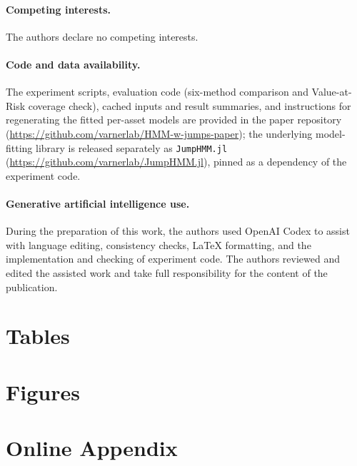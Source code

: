 \documentclass{article}
\theoremstyle{definition}
\theoremstyle{remark}
\begin{document}
\paragraph{Competing interests.}
The authors declare no competing interests.

\paragraph{Code and data availability.}
The experiment scripts, evaluation code (six-method comparison and
Value-at-Risk coverage check), cached inputs and
result summaries, and instructions for regenerating the fitted
per-asset models are provided in the paper repository
(\url{https://github.com/varnerlab/HMM-w-jumps-paper}); the
underlying model-fitting library is released separately as
\texttt{JumpHMM.jl}
(\url{https://github.com/varnerlab/JumpHMM.jl}), pinned as a
dependency of the experiment code.

\paragraph{Generative artificial intelligence use.}
During the preparation of this work, the authors used OpenAI Codex to
assist with language editing, consistency checks, LaTeX formatting,
and the implementation and checking of experiment code. The authors
reviewed and edited the assisted work and take full responsibility for
the content of the publication.

\clearpage



\clearpage
\section*{Tables}


\clearpage
\section*{Figures}


\clearpage
\appendix
\section*{Online Appendix}
\renewcommand{\thesection}{S\arabic{section}}
\renewcommand{\thesubsection}{S\arabic{section}.\arabic{subsection}}
\renewcommand{\thefigure}{S\arabic{figure}}
\renewcommand{\thetable}{S\arabic{table}}
\renewcommand{\theequation}{S\arabic{equation}}
\renewcommand{\theHsection}{supp.\arabic{section}}
\renewcommand{\theHsubsection}{supp.\arabic{section}.\arabic{subsection}}
\renewcommand{\theHfigure}{supp.\arabic{figure}}
\renewcommand{\theHtable}{supp.\arabic{table}}
\renewcommand{\theHequation}{supp.\arabic{equation}}
\setcounter{section}{0}
\setcounter{figure}{0}
\setcounter{table}{0}
\setcounter{equation}{0}


\end{document}

